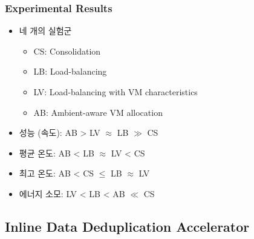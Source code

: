 \subsubsection*{Experimental Results}
\begin{itemize}
    \item 네 개의 실험군
    \begin{itemize}
        \item CS: Consolidation
        \item LB: Load-balancing
        \item LV: Load-balancing with VM characteristics
        \item AB: Ambient-aware VM allocation
    \end{itemize}
    \item 성능 (속도): AB \textgreater{} LV $\approx$ LB $\gg$ CS
    \item 평균 온도: AB \textless{} LB $\approx$ LV \textless{} CS
    \item 최고 온도: AB \textless{} CS $\leq$ LB $\approx$ LV
    \item 에너지 소모: LV \textless{} LB \textless{} AB $\ll$ CS
\end{itemize}

\subsection{Inline Data Deduplication Accelerator}


